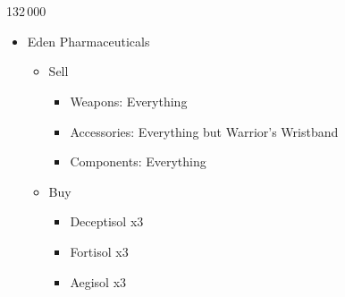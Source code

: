 \chapter[Chapter 13]{}
\begin{multicols}{2}
\begin{shop}{132\,000}
\begin{itemize}
    \item Eden Pharmaceuticals
    \begin{itemize}
        \item Sell
        \begin{itemize}
            \item Weapons: Everything
            \item Accessories: Everything but Warrior's Wristband
            \item Components: Everything
        \end{itemize}
        \item Buy
        \begin{itemize}
            \item Deceptisol x3
            \item Fortisol x3
            \item Aegisol x3
        \end{itemize}
    \end{itemize}
\end{itemize}
\end{shop}


\end{multicols}
